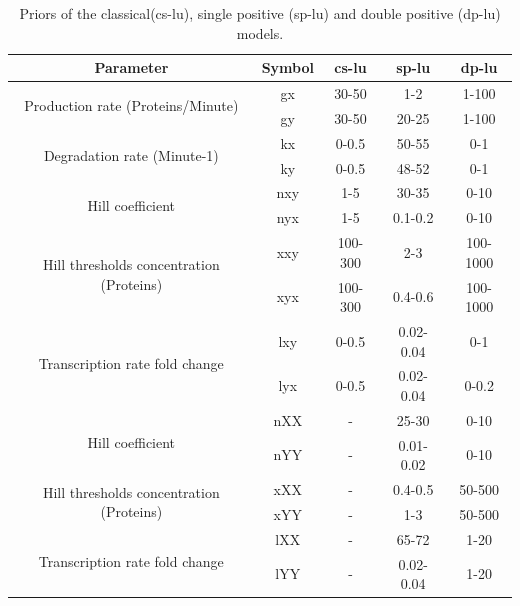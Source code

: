 \begin{table}[htpb]
\centering
\caption{Priors of the classical(\acrshort{cs-lu}), single positive (\acrshort{sp-lu}) and double positive (\acrshort{dp-lu}) models.}
\label{tab:lu_all}
\begin{tabular}{@{}ccccc@{}}
\toprule
Parameter                                            & Symbol & \acrshort{cs-lu}        & \acrshort{sp-lu}         & \acrshort{dp-lu}       \\ \midrule
\multirow{2}{4cm}{Production rate (Proteins/Minute)}                & gx        & 30-50   & 1-2       & 1-100    \\
                                                & gy        & 30-50   & 20-25     & 1-100    \\[4pt]
\multirow{2}{4cm}{Degradation rate (Minute-1)}               & kx        & 0-0.5   & 50-55     & 0-1      \\
                                                & ky        & 0-0.5   & 48-52     & 0-1      \\[4pt]
\multirow{2}{4cm}{Hill coefficient}               & nxy       & 1-5     & 30-35     & 0-10     \\
                                                & nyx       & 1-5     & 0.1-0.2   & 0-10     \\[4pt]
\multirow{2}{4cm}{Hill thresholds concentration (Proteins)}  & xxy       & 100-300 & 2-3       & 100-1000 \\
                                                & xyx       & 100-300 & 0.4-0.6   & 100-1000 \\[4pt]
\multirow{2}{4cm}{Transcription rate fold change} & lxy       & 0-0.5   & 0.02-0.04 & 0-1      \\
                                                & lyx       & 0-0.5   & 0.02-0.04 & 0-0.2    \\[4pt]
\multirow{2}{4cm}{Hill coefficient}               & nXX       & -       & 25-30     & 0-10     \\
                                                & nYY       & -       & 0.01-0.02 & 0-10     \\[4pt]
\multirow{2}{4cm}{Hill thresholds concentration (Proteins)}  & xXX       & -       & 0.4-0.5   & 50-500   \\
                                                & xYY       & -       & 1-3       & 50-500   \\[4pt]
\multirow{2}{4cm}{Transcription rate fold change} & lXX       & -       & 65-72     & 1-20     \\
                                                & lYY       & -       & 0.02-0.04 & 1-20     \\ \hline
\end{tabular}
\end{table}



